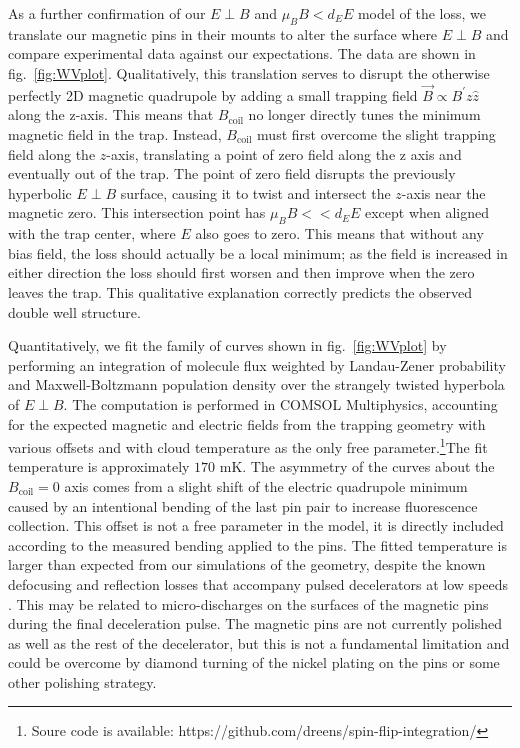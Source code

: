 \documentclass[%
 reprint,
 amsmath,amssymb,
 aps,
prl,
]{revtex4-1}
\begin{document}
As a further confirmation of our $E\!\perp\! B$ and $\mu_BB<d_EE$ model of the loss, we translate our magnetic pins in their mounts to alter the surface where $E\!\perp\! B$ and compare experimental data against our expectations. The data are shown in fig.~\ref{fig:WVplot}. Qualitatively, this translation serves to disrupt the otherwise perfectly 2D magnetic quadrupole by adding a small trapping field $\vec{B}\propto B^\prime z\hat{z}$ along the z-axis. This means that $B_\text{coil}$ no longer directly tunes the minimum magnetic field in the trap. Instead, $B_\text{coil}$ must first overcome the slight trapping field along the $z$-axis, translating a point of zero field along the z axis and eventually out of the trap. The point of zero field disrupts the previously hyperbolic $E\!\perp\! B$ surface, causing it to twist and intersect the $z$-axis near the magnetic zero. This intersection point has $\mu_BB<< d_EE$ except when aligned with the trap center, where $E$ also goes to zero. This means that without any bias field, the loss should actually be a local minimum; as the field is increased in either direction the loss should first worsen and then improve when the zero leaves the trap. This qualitative explanation correctly predicts the observed double well structure.

Quantitatively, we fit the family of curves shown in fig.~\ref{fig:WVplot} by performing an integration of molecule flux weighted by Landau-Zener probability and Maxwell-Boltzmann population density over the strangely twisted hyperbola of $E\!\perp\! B$. The computation is performed in COMSOL Multiphysics, accounting for the expected magnetic and electric fields from the trapping geometry with various offsets and with cloud temperature as the only free parameter.\footnote{Soure code is available: https://github.com/dreens/spin-flip-integration/}The fit temperature is approximately $170\text{ mK}$. The asymmetry of the curves about the $B_\text{coil}=0$ axis comes from a slight shift of the electric quadrupole minimum caused by an intentional bending of the last pin pair to increase fluorescence collection. This offset is not a free parameter in the model, it is directly included according to the measured bending applied to the pins. The fitted temperature is larger than expected from our simulations of the geometry, despite the known defocusing and reflection losses that accompany pulsed decelerators at low speeds \cite{Sawyer2008a}. This may be related to micro-discharges on the surfaces of the magnetic pins during the final deceleration pulse. The magnetic pins are not currently polished as well as the rest of the decelerator, but this is not a fundamental limitation and could be overcome by diamond turning of the nickel plating on the pins or some other polishing strategy.
\end{document}
